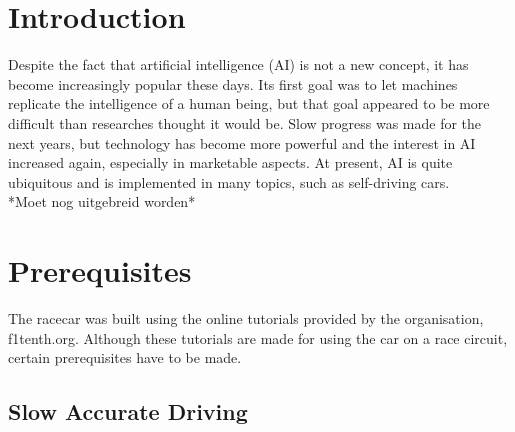 \documentclass[conference,a4paper]{IEEEtran}
\begin{document}

%
\IEEEpeerreviewmaketitle



\section{Introduction}
Despite the fact that artificial intelligence (AI) is not a new concept, it has become increasingly popular these days. Its first goal was to let machines replicate the intelligence of a human being, but that goal appeared to be more difficult than researches thought it would be. Slow progress was made for the next years, but technology has become more powerful and the interest in AI increased again, especially in marketable aspects\cite{Brooks1991}. At present, AI is quite ubiquitous and is implemented in many topics, such as self-driving cars. \\

*Moet nog uitgebreid worden*

\section{Prerequisites}
The racecar was built using the online tutorials provided by the organisation, f1tenth.org. Although these tutorials are made for using the car on a race circuit, certain prerequisites have to be made. 

\subsection{Slow Accurate Driving}
\end{document}
